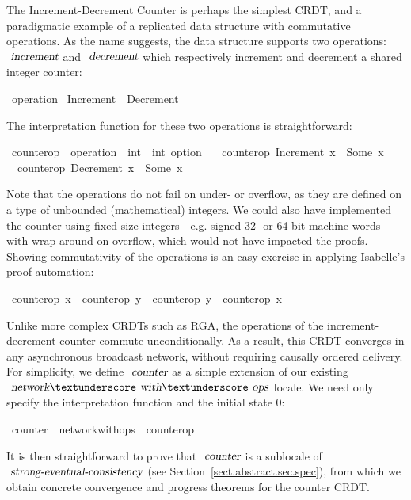 The Increment-Decrement Counter is perhaps the simplest CRDT, and a paradigmatic example of a replicated data structure with commutative operations.
As the name suggests, the data structure supports two operations: $\isa{increment}$ and $\isa{decrement}$ which respectively increment and decrement a shared integer counter:
\begin{isabelle}
\ operation {\isacharequal}\ Increment\ {\isacharbar}\ Decrement
\end{isabelle}
\noindent The interpretation function for these two operations is straightforward:
\begin{isabelle}
\ counter{\isacharunderscore}op\ {\isacharcolon}{\isacharcolon}\ {\isachardoublequoteopen}operation\ {\isasymRightarrow}\ int\ {\isasymRightarrow}\ int\ option{\isachardoublequoteclose}\ \isanewline
\ \ {\isachardoublequoteopen}counter{\isacharunderscore}op\ Increment\ x\ {\isacharequal}\ Some\ {\isacharparenleft}x\ {\isacharplus}\ {}{\isacharparenright}{\isachardoublequoteclose}\ {\isacharbar}\isanewline
\ \ {\isachardoublequoteopen}counter{\isacharunderscore}op\ Decrement\ x\ {\isacharequal}\ Some\ {\isacharparenleft}x\ {\isacharminus}\ {}{\isacharparenright}{\isachardoublequoteclose}
\end{isabelle}
Note that the operations do not fail on under- or overflow, as they are defined on a type of unbounded (mathematical) integers.
We could also have implemented the counter using fixed-size integers---e.g. signed 32- or 64-bit machine words---with wrap-around on overflow, which would not have impacted the proofs.
Showing commutativity of the operations is an easy exercise in applying Isabelle's proof automation:
\begin{isabelle}
\ {\isachardoublequoteopen}counter{\isacharunderscore}op\ x\ {\isasymrhd}\ counter{\isacharunderscore}op\ y\ {\isacharequal}\ counter{\isacharunderscore}op\ y\ {\isasymrhd}\ counter{\isacharunderscore}op\ x{\isachardoublequoteclose}
\end{isabelle}
Unlike more complex CRDTs such as RGA, the operations of the increment-decrement counter commute unconditionally.
As a result, this CRDT converges in any asynchronous broadcast network, without requiring causally ordered delivery.
For simplicity, we define $\isa{counter}$ as a simple extension of our existing $\isa{network}{\isacharunderscore}\isa{with}{\isacharunderscore}\isa{ops}$ locale.
We need only specify the interpretation function and the initial state 0:
\begin{isabelle}
\ counter\ {\isacharequal}\ network{\isacharunderscore}with{\isacharunderscore}ops\ {\isacharunderscore}\ counter{\isacharunderscore}op\ {}
\end{isabelle}
It is then straightforward to prove that $\isa{counter}$ is a sublocale of $\isa{strong-eventual-consistency}$ (see Section~\ref{sect.abstract.sec.spec}), from which we obtain concrete convergence and progress theorems for the counter CRDT.

